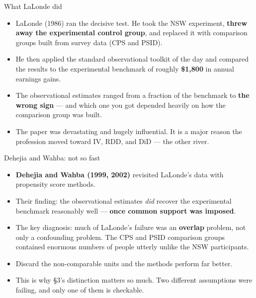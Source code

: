 \documentclass[
  11pt,
  ignorenonframetext,
  aspectratio=169,
]{beamer}
\providecommand{\tightlist}{%
  \setlength{\itemsep}{0pt}\setlength{\parskip}{0pt}}
\begin{document}
\begin{frame}{What LaLonde did}
\protect{}\label{what-lalonde-did}
\begin{itemize}
\tightlist
\item
  LaLonde (1986) ran the decisive test. He took the NSW experiment,
  \textbf{threw away the experimental control group}, and replaced it
  with comparison groups built from survey data (CPS and PSID).
\item
  He then applied the standard observational toolkit of the day and
  compared the results to the experimental benchmark of roughly
  \textbf{\$1,800} in annual earnings gains.
\item
  The observational estimates ranged from a fraction of the benchmark to
  \textbf{the wrong sign} --- and which one you got depended heavily on
  how the comparison group was built.
\item
  The paper was devastating and hugely influential. It is a major reason
  the profession moved toward IV, RDD, and DiD --- the other river.
\end{itemize}
\end{frame}

\begin{frame}{Dehejia and Wahba: not so fast}
\protect{}\label{dehejia-and-wahba-not-so-fast}
\begin{itemize}
\tightlist
\item
  \textbf{Dehejia and Wahba (1999, 2002)} revisited LaLonde's data with
  propensity score methods.
\item
  Their finding: the observational estimates \emph{did} recover the
  experimental benchmark reasonably well --- \textbf{once common support
  was imposed}.
\item
  The key diagnosis: much of LaLonde's failure was an \textbf{overlap}
  problem, not only a confounding problem. The CPS and PSID comparison
  groups contained enormous numbers of people utterly unlike the NSW
  participants.
\item
  Discard the non-comparable units and the methods perform far better.
\item
  This is why §3's distinction matters so much. Two different
  assumptions were failing, and only one of them is checkable.
\end{itemize}
\end{frame}
\end{document}

